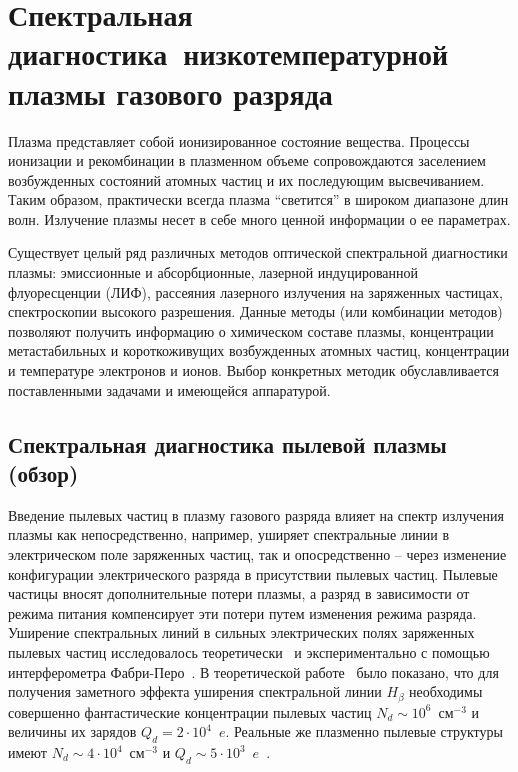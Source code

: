 \chapter{Спектральная диагностика~низкотемпературной плазмы газового разряда}
\label{cha:ch_1}

Плазма представляет собой ионизированное состояние вещества. Процессы
ионизации и рекомбинации в плазменном объеме сопровождаются заселением
возбужденных состояний атомных частиц и их последующим высвечиванием.
Таким образом, практически всегда плазма “светится” в широком диапазоне длин
волн. Излучение плазмы несет в себе много ценной информации о ее параметрах.

Существует целый ряд различных методов оптической спектральной
диагностики плазмы: эмиссионные и абсорбционные, лазерной индуцированной
флуоресценции (ЛИФ), рассеяния лазерного излучения на заряженных частицах,
спектроскопии высокого разрешения. Данные методы (или комбинации методов)
позволяют получить информацию о химическом составе плазмы, концентрации
метастабильных и короткоживущих возбужденных атомных частиц, концентрации
и температуре электронов и ионов. Выбор конкретных методик обуславливается
поставленными задачами и имеющейся аппаратурой.

\section{Спектральная диагностика пылевой плазмы (обзор)}
Введение пылевых частиц в плазму газового разряда влияет на спектр излучения плазмы как
непосредственно, например, уширяет спектральные линии в электрическом поле заряженных частиц,
так и опосредственно – через изменение конфигурации электрического разряда в присутствии пылевых частиц.
Пылевые частицы вносят дополнительные потери плазмы, а разряд в зависимости от режима питания компенсирует
эти потери путем изменения режима разряда. Уширение спектральных линий в сильных
электрических полях заряженных пылевых частиц исследовалось теоретически~\cite{TRINITI} и экспериментально
с помощью интерферометра Фабри-Перо~\cite{Pikalev2014}.
В теоретической работе~\cite{TRINITI} было показано, что для получения заметного эффекта уширения спектральной линии
$H_{\beta}$ необходимы совершенно фантастические концентрации пылевых частиц $N_d \sim 10^6$~см$^{-3}$ и величины
их зарядов $Q_d = 2 \cdot 10^4$~$e$.
Реальные же плазменно пылевые структуры имеют $N_d \sim 4 \cdot 10^4$~см$^{-3}$ и $Q_d \sim 5 \cdot 10^3$~$e$~\cite{Zobnin2018}.

